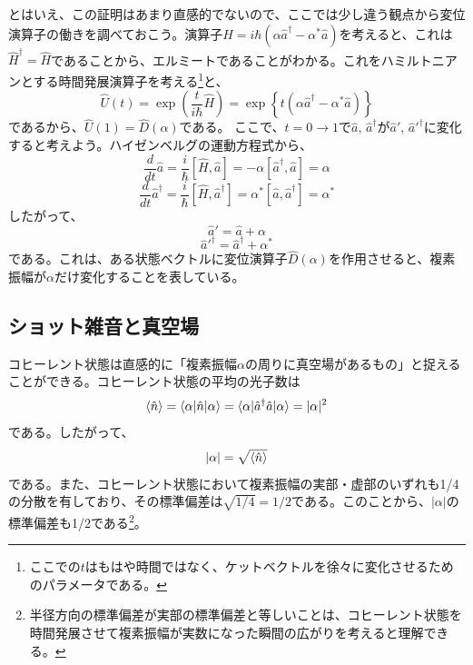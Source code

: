 とはいえ、この証明はあまり直感的でないので、ここでは少し違う観点から変位演算子の働きを調べておこう。演算子$\hat H = i\hbar(\alpha\hat a^\dagger - \alpha ^*\hat a)$を考えると、これは$\hat H^\dagger = \hat H$であることから、エルミートであることがわかる。これをハミルトニアンとする時間発展演算子を考える\footnote{ここでの$t$はもはや時間ではなく、ケットベクトルを徐々に変化させるためのパラメータである。}と、
\begin{equation}
\hat U(t) = \exp\left(\frac{t}{i\hbar}\hat H\right) = \exp\left\{t(\alpha\hat a^\dagger - \alpha^* \hat a)\right\}
\end{equation}
であるから、$\hat U(1) = \hat D(\alpha)$である。
ここで、$t = 0 \to 1$で$\hat a$, $\hat a^\dagger$が$\hat a'$, $\hat a'^\dagger$に変化すると考えよう。ハイゼンベルグの運動方程式から、
\begin{equation}
 \frac{d}{dt}\hat a = \frac i \hbar[\hat H, \hat a] = -\alpha [\hat a^\dagger, \hat a] = \alpha
\end{equation}
\begin{equation}
  \frac{d}{dt}\hat a^\dagger = \frac i \hbar [\hat H, \hat a^\dagger] = \alpha^*[\hat a, \hat a^\dagger] = \alpha^*
\end{equation}
したがって、
\begin{equation}
  \hat a' = \hat a + \alpha
\end{equation}
\begin{equation}
  \hat a'^\dagger = \hat a^\dagger + \alpha ^*
\end{equation}
である。これは、ある状態ベクトルに変位演算子$\hat D(\alpha)$を作用させると、複素振幅が$\alpha$だけ変化することを表している。

\subsection{ショット雑音と真空場}
コヒーレント状態は直感的に「複素振幅$\alpha$の周りに真空場があるもの」と捉えることができる。コヒーレント状態の平均の光子数は
\begin{equation}
  \braket{\hat n} = \braket{\alpha | \hat n |\alpha} = \braket {\alpha |\hat a^\dagger \hat a|\alpha} = |\alpha|^2
\end{equation}
である。したがって、
\begin{equation}
  |\alpha| = \sqrt{\braket {\hat n}}
\end{equation}
である。また、コヒーレント状態において複素振幅の実部・虚部のいずれも1/4の分散を有しており、その標準偏差は$\sqrt{1/4} = 1/2$である。このことから、$|\alpha|$の標準偏差も1/2である\footnote{半径方向の標準偏差が実部の標準偏差と等しいことは、コヒーレント状態を時間発展させて複素振幅が実数になった瞬間の広がりを考えると理解できる。}。

